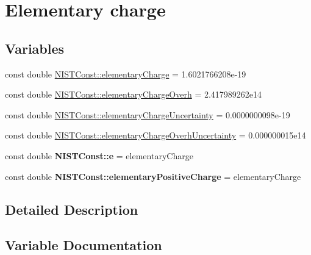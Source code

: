 \hypertarget{group___elementary_charge}{}\section{Elementary charge}
\label{group___elementary_charge}
\subsection*{Variables}
\begin{DoxyCompactItemize}
\item 
const double \hyperlink{group___elementary_charge_gaaa025a77a5281c83628ff8cb46f8038f}{N\+I\+S\+T\+Const\+::elementary\+Charge} = 1.\+6021766208e-\/19
\item 
const double \hyperlink{group___elementary_charge_ga262dea92054df909a97626e3c804f1b4}{N\+I\+S\+T\+Const\+::elementary\+Charge\+Overh} = 2.\+417989262e14
\item 
const double \hyperlink{group___elementary_charge_ga8e2ed13fe11bd4253e61c6f893a6778d}{N\+I\+S\+T\+Const\+::elementary\+Charge\+Uncertainty} = 0.\+0000000098e-\/19
\item 
const double \hyperlink{group___elementary_charge_gadc450d412ab46877fee4e29d8ccf7ce3}{N\+I\+S\+T\+Const\+::elementary\+Charge\+Overh\+Uncertainty} = 0.\+000000015e14
\item 
\mbox{\label{group___elementary_charge_gad3e7e33fe20772dfbc4b39e433eb2f3a}} 
const double {\bfseries N\+I\+S\+T\+Const\+::e} = elementary\+Charge
\item 
\mbox{\label{group___elementary_charge_ga1177663318bfe8bfa4b0c4fa489fbfb2}} 
const double {\bfseries N\+I\+S\+T\+Const\+::elementary\+Positive\+Charge} = elementary\+Charge
\end{DoxyCompactItemize}


\subsection{Detailed Description}


\subsection{Variable Documentation}
\mbox{\label{group___elementary_charge_gaaa025a77a5281c83628ff8cb46f8038f}} 
